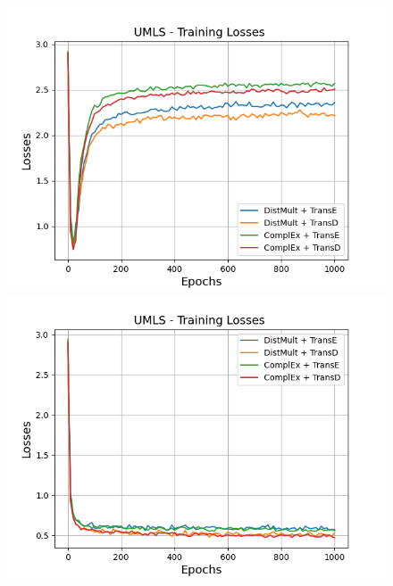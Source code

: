 \begin{figure}
    \centering
    \begin{minipage}{.5\textwidth}
      \centering
      \includegraphics[width=0.9\linewidth]{figures/results/gan_train/not_pretrained/random/umls/epochs1000/random_umls_losses.png}
    \end{minipage}%
    \begin{minipage}{.5\textwidth}
      \centering
      \includegraphics[width=0.9\linewidth]{figures/results/gan_train/not_pretrained/uncertainty/max_distribution/entropy/umls/1k_epochs/uncertainty_umls_losses.png}
    \end{minipage}
    \begin{minipage}{.5\textwidth}
      \centering

\end{minipage}
\end{figure}
